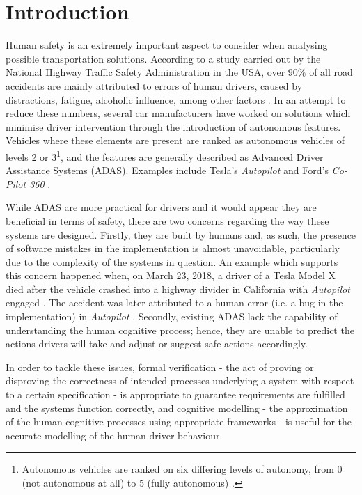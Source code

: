 \chapter{Introduction}

Human safety is an extremely important aspect to consider when analysing possible transportation solutions. According to a study carried out by the National Highway Traffic Safety Administration in the USA, over $90\%$ of all road accidents are mainly attributed to errors of human drivers, caused by distractions, fatigue, alcoholic influence, among other factors \cite{crashes}. In an attempt to reduce these numbers, several car manufacturers have worked on solutions which minimise driver intervention through the introduction of autonomous features. Vehicles where these elements are present are ranked as autonomous vehicles of levels 2 or 3\footnote{Autonomous vehicles are ranked on six differing levels of autonomy, from 0 (not autonomous at all) to 5 (fully autonomous) \cite{wired}.}, and the features are generally described as Advanced Driver Assistance Systems (ADAS). Examples include Tesla's \textit{Autopilot} and Ford's \textit{Co-Pilot 360} \cite{autopilot1, ford}.

While ADAS are more practical for drivers and it would appear they are beneficial in terms of safety, there are two concerns regarding the way these systems are designed. Firstly, they are built by humans and, as such, the presence of software mistakes in the implementation is almost unavoidable, particularly due to the complexity of the systems in question. An example which supports this concern happened when, on March 23, 2018, a driver of a Tesla Model X died after the vehicle crashed into a highway divider in California with \textit{Autopilot} engaged \cite{autopilot2}. The accident was later attributed to a human error (i.e. a bug in the implementation) in \textit{Autopilot} \cite{autopilot3}. Secondly, existing ADAS lack the capability of understanding the human cognitive process; hence, they are unable to predict the actions drivers will take and adjust or suggest safe actions accordingly.

In order to tackle these issues, formal verification - the act of proving or disproving the correctness of intended processes underlying a system with respect to a certain specification \cite{bk08} - is appropriate to guarantee requirements are fulfilled and the systems function correctly, and cognitive modelling - the approximation of the human cognitive processes using appropriate frameworks \cite{actr_1} - is useful for the accurate modelling of the human driver behaviour.

